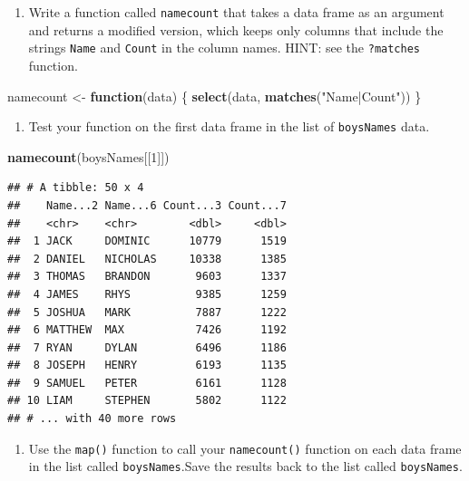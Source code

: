 \documentclass[
]{book}
\newenvironment{Shaded}{\begin{snugshade}}{\end{snugshade}}
\newcommand{\ControlFlowTok}[1]{\textcolor[rgb]{0.13,0.29,0.53}{\textbf{#1}}}
\newcommand{\DecValTok}[1]{\textcolor[rgb]{0.00,0.00,0.81}{#1}}
\newcommand{\KeywordTok}[1]{\textcolor[rgb]{0.13,0.29,0.53}{\textbf{#1}}}
\newcommand{\NormalTok}[1]{#1}
\newcommand{\StringTok}[1]{\textcolor[rgb]{0.31,0.60,0.02}{#1}}
\providecommand{\tightlist}{%
  \setlength{\itemsep}{0pt}\setlength{\parskip}{0pt}}
\begin{document}
\begin{alert}

\begin{enumerate}
\def\labelenumi{\arabic{enumi}.}
\tightlist
\item
  Write a function called \texttt{namecount} that takes a data frame as an argument and returns a modified version, which keeps only columns that include the strings \texttt{Name} and \texttt{Count} in the column names. HINT: see the \texttt{?matches} function.
\end{enumerate}

\begin{Shaded}
\begin{Highlighting}[]
\NormalTok{  namecount \textless{}{-}}\StringTok{ }\ControlFlowTok{function}\NormalTok{(data) \{}
      \KeywordTok{select}\NormalTok{(data, }\KeywordTok{matches}\NormalTok{(}\StringTok{"Name|Count"}\NormalTok{))}
\NormalTok{  \}}
\end{Highlighting}
\end{Shaded}

\begin{enumerate}
\def\labelenumi{\arabic{enumi}.}
\setcounter{enumi}{1}
\tightlist
\item
  Test your function on the first data frame in the list of \texttt{boysNames} data.
\end{enumerate}

\begin{Shaded}
\begin{Highlighting}[]
  \KeywordTok{namecount}\NormalTok{(boysNames[[}\DecValTok{1}\NormalTok{]])}
\end{Highlighting}
\end{Shaded}

\begin{verbatim}
## # A tibble: 50 x 4
##    Name...2 Name...6 Count...3 Count...7
##    <chr>    <chr>        <dbl>     <dbl>
##  1 JACK     DOMINIC      10779      1519
##  2 DANIEL   NICHOLAS     10338      1385
##  3 THOMAS   BRANDON       9603      1337
##  4 JAMES    RHYS          9385      1259
##  5 JOSHUA   MARK          7887      1222
##  6 MATTHEW  MAX           7426      1192
##  7 RYAN     DYLAN         6496      1186
##  8 JOSEPH   HENRY         6193      1135
##  9 SAMUEL   PETER         6161      1128
## 10 LIAM     STEPHEN       5802      1122
## # ... with 40 more rows
\end{verbatim}

\begin{enumerate}
\def\labelenumi{\arabic{enumi}.}
\setcounter{enumi}{2}
\tightlist
\item
  Use the \texttt{map()} function to call your \texttt{namecount()} function on each data frame in the list called \texttt{boysNames}.Save the results back to the list called \texttt{boysNames}.
\end{enumerate}


\end{alert}
\end{document}
